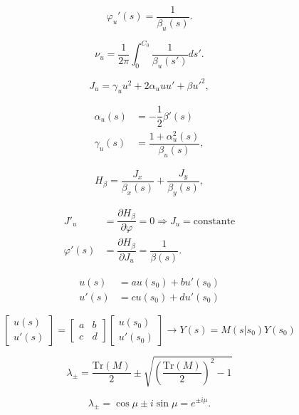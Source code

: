 \begin{equation}
    \varphi_u'(s) = \dfrac{1}{\beta_u(s)}.
\end{equation}

\begin{equation}
    \nu_u = \dfrac{1}{2\pi} \int_{0}^{C_0} \dfrac{1}{\beta_u(s')}ds'.
\end{equation}

\begin{equation}
    J_u = \gamma_u u^2 + 2\alpha_u u u' + \beta u'^2,
    \label{acao}
\end{equation}

\begin{align}
    \alpha_u(s) &= -\dfrac{1}{2}\beta'(s) \\
    \gamma_u(s) &= \dfrac{1+\alpha^2_u(s)}{\beta_u(s)},
\end{align}

\begin{equation}
    H_\beta = \dfrac{J_x}{\beta_x(s)} + \dfrac{J_y}{\beta_y(s)},
\end{equation}


\begin{align}
    J'_u & = \dfrac{\partial H_\beta}{\partial \varphi} = 0 \Rightarrow J_u = \mathrm{constante}\\
    \varphi'(s) & = \dfrac{\partial H_\beta}{\partial J_u} = \dfrac{1}{\beta(s)}.
\end{align}


\begin{align}
    u(s) &= au(s_0) + bu'(s_0) \\
    u'(s) &= cu(s_0) + du'(s_0)
\end{align}

\[
\left[ \begin{array}{c} 
u(s) \\
u'(s) \end{array} \right] = \left[ \begin{array}{cc} 
a & b \\
c & d \end{array} \right]\left[ \begin{array}{c} 
u(s_0) \\
u'(s_0) \end{array} \right] \rightarrow Y(s) = M(s|s_0)Y(s_0)
\]


\[
\lambda_{\pm} = \dfrac{\mathrm{Tr}\left(M\right)}{2} \pm \sqrt{\left(\dfrac{\mathrm{Tr}(M)}{2}\right)^2 - 1}
\]


\[
\lambda_{\pm} = \cos\mu \pm i \sin\mu = e^{\pm i\mu}.
\]


